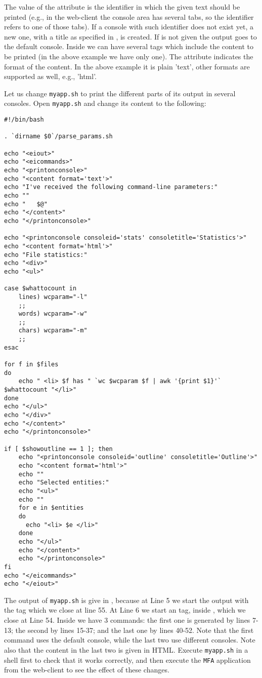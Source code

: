 \medskip
\noindent
The value of the  attribute is the identifier in which
the given text should be printed (e.g., in the web-client the console
area has several tabs, so the identifier refers to one of those
tabs). If a console with such identifier does not exist yet, a new
one, with a title as specified in , is created. If
 is not given the output goes to the default console.
%
Inside  we can have several  tags
which include the content to be printed (in the above example we have
only one). The attribute  indicates the format of the
content. In the above example it is plain 'text', other formats are
supported as well, e.g., 'html'.
%

Let us change \texttt{myapp.sh} to print the different parts of its
output in several consoles. Open \texttt{myapp.sh} and change its
content to the following:


\medskip
\begin{lstlisting}[style=script]
#!/bin/bash

. `dirname $0`/parse_params.sh

echo "<eiout>"
echo "<eicommands>"
echo "<printonconsole>"
echo "<content format='text'>"
echo "I've received the following command-line parameters:"
echo ""
echo "   $@"
echo "</content>"
echo "</printonconsole>"

echo "<printonconsole consoleid='stats' consoletitle='Statistics'>"
echo "<content format='html'>"
echo "File statistics:"
echo "<div>"
echo "<ul>"

case $whattocount in
    lines) wcparam="-l"
    ;;
    words) wcparam="-w"
    ;;
    chars) wcparam="-m"
    ;;
esac

for f in $files 
do
    echo " <li> $f has " `wc $wcparam $f | awk '{print $1}'` $whattocount "</li>"
done
echo "</ul>"
echo "</div>"
echo "</content>"
echo "</printonconsole>"

if [ $showoutline == 1 ]; then
    echo "<printonconsole consoleid='outline' consoletitle='Outline'>"
    echo "<content format='html'>"
    echo ""
    echo "Selected entities:"
    echo "<ul>"
    echo ""
    for e in $entities 
    do
      echo "<li> $e </li>"
    done
    echo "</ul>"
    echo "</content>"
    echo "</printonconsole>"
fi
echo "</eicommands>"
echo "</eiout>"
\end{lstlisting}

\medskip
\noindent
The output of \texttt{myapp.sh} is give in \eiol, because at Line 5 we
start the output with the tag  which we close at line 55.
%
At Line 6 we start an  tag, inside , which
we close at Line 54.
%
Inside  we have 3  commands:
%
the first one is generated by lines 7-13; the second by lines 15-37;
and the last one by lines 40-52.
%
Note that the first command uses the default console, while the last
two use different consoles. Note also that the content in the last two
is given in HTML. 
%
Execute \texttt{myapp.sh} in a shell first to check that it works
correctly, and then execute the \texttt{MFA} application from the
web-client to see the effect of these changes.


